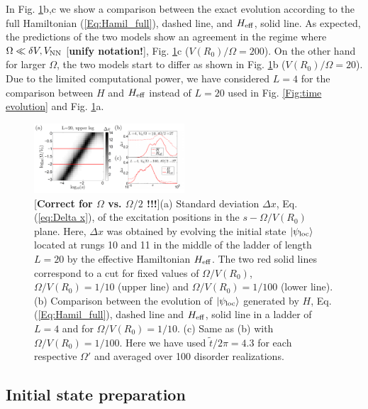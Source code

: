 \documentclass[prl,aps,twocolumn,showpacs,superscriptaddress,longbibliography]{revtex4-1}
\newcommand{\ran}{\right\rangle}
\newcommand{\ket}[1]{\left| #1 \ran}
\begin{document}
In Fig. \ref{Fig:Dx_scan}b,c we show a comparison between the exact evolution according to the full Hamiltonian (\ref{Eq:Hamil_full}), dashed line, and $H_{\rm eff}$, solid line. As expected, the predictions of the two models show an agreement in the regime where $\Omega \ll \delta V, V_{\rm NN}$ [{\bf unify notation!}], Fig. \ref{Fig:Dx_scan}c ($V(R_0)/\Omega=200$). On the other hand for larger $\Omega$, the two models start to differ as shown in Fig. \ref{Fig:Dx_scan}b ($V(R_0)/\Omega=20$). Due to the limited computational power, we have considered $L=4$ for the comparison between $H$ and $H_{\rm eff}$ instead of $L=20$ used in Fig. \ref{Fig:time evolution} and Fig. \ref{Fig:Dx_scan}a.


\begin{figure}

	      \includegraphics[width=0.5\textwidth]{graphics/Dx_vs_s_Omega.pdf}
		\caption{[{\bf Correct for $\Omega$ vs. $\Omega/2$ !!!}](a) Standard deviation $\Delta x$, Eq. (\ref{eq:Delta x}), of the excitation positions in the $s-\Omega/V(R_0)$ plane. Here, $\Delta x$ was obtained by evolving the initial state $\ket{\psi_{\rm loc}}$ located at rungs 10 and 11 in the middle of the ladder of length $L=20$ by the effective Hamiltonian $H_{\rm eff}$. The two red solid lines correspond to a cut for fixed values of $\Omega/V(R_0)$, $\Omega/V(R_0)=1/10$ (upper line) and $\Omega/V(R_0)=1/100$ (lower line). (b) Comparison between the evolution of $\ket{\psi_{\rm loc}}$ generated by $H$, Eq. (\ref{Eq:Hamil_full}), dashed line and $H_{\rm eff}$, solid line in a ladder of $L=4$ and for $\Omega/V(R_0)=1/10$. (c) Same as (b) with $\Omega/V(R_0)=1/100$. Here we have used $\tilde{t}/2 \pi = 4.3$ for each respective $\Omega'$ and averaged over 100 disorder realizations. 
		}
 \label{Fig:Dx_scan}
   
\end{figure}  


\subsection{Initial state preparation}
\end{document}
